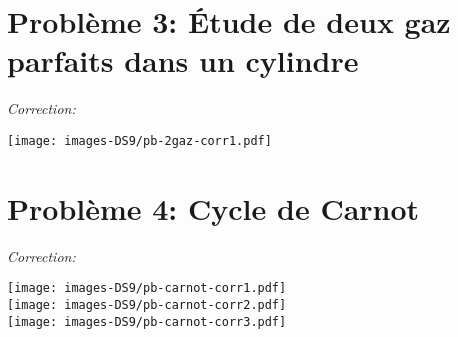 \documentclass[
  10pt,
  french,
  a4paper,
  DIV=18]{scrartcl}
\begin{document}
\section*{Problème 3: Étude de deux gaz parfaits dans un
cylindre}\label{probluxe8me-3-uxe9tude-de-deux-gaz-parfaits-dans-un-cylindre}

{\sffamily \emph{Correction:}

\begin{center}

\texttt{[image: images-DS9/pb-2gaz-corr1.pdf]}

\end{center}

}

\section*{Problème 4: Cycle de
Carnot}\label{probluxe8me-4-cycle-de-carnot}

{\sffamily \emph{Correction:}

\begin{center}

\texttt{[image: images-DS9/pb-carnot-corr1.pdf]}\\
\texttt{[image: images-DS9/pb-carnot-corr2.pdf]}\\
\texttt{[image: images-DS9/pb-carnot-corr3.pdf]}

\end{center}

}
\end{document}
